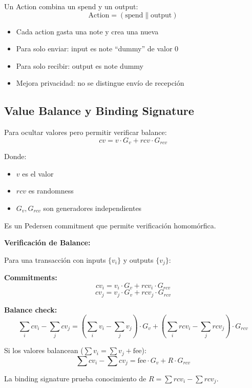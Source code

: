 \documentclass[11pt,a4paper,twoside]{book}
\begin{document}
\begin{definition}
Un Action combina un spend y un output:
\[
\text{Action} = (\text{spend} \parallel \text{output})
\]

\begin{itemize}
    \item Cada action gasta una note y crea una nueva
    \item Para solo enviar: input es note ``dummy'' de valor 0
    \item Para solo recibir: output es note dummy
    \item Mejora privacidad: no se distingue env\'io de recepci\'on
\end{itemize}
\end{definition}

\subsection{Value Balance y Binding Signature}

\begin{definition}
Para ocultar valores pero permitir verificar balance:
\[
cv = v \cdot G_v + rcv \cdot G_{rcv}
\]

Donde:
\begin{itemize}
    \item $v$ es el valor
    \item $rcv$ es randomness
    \item $G_v, G_{rcv}$ son generadores independientes
\end{itemize}

Es un Pedersen commitment que permite verificaci\'on homom\'orfica.
\end{definition}

\begin{mathnote}
\textbf{Verificaci\'on de Balance:}

Para una transacci\'on con inputs $\{v_i\}$ y outputs $\{v_j\}$:

\textbf{Commitments:}
\[
cv_i = v_i \cdot G_v + rcv_i \cdot G_{rcv}
\]
\[
cv_j = v_j \cdot G_v + rcv_j \cdot G_{rcv}
\]

\textbf{Balance check:}
\[
\sum_i cv_i - \sum_j cv_j = \left(\sum_i v_i - \sum_j v_j\right) \cdot G_v + \left(\sum_i rcv_i - \sum_j rcv_j\right) \cdot G_{rcv}
\]

Si los valores balancean ($\sum v_i = \sum v_j + \text{fee}$):
\[
\sum cv_i - \sum cv_j = \text{fee} \cdot G_v + R \cdot G_{rcv}
\]

La binding signature prueba conocimiento de $R = \sum rcv_i - \sum rcv_j$.
\end{mathnote}
\end{document}
